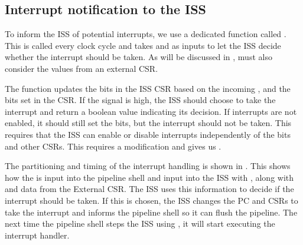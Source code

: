 \subsection{Interrupt notification to the ISS}

To inform the ISS of potential interrupts, we use a dedicated function called . This is called every clock cycle and takes  and  as inputs to let the ISS decide whether the interrupt should be taken. As will be discussed in ,  must also consider the values from an external CSR.

The  function updates the  bits in the ISS CSR based on the incoming , and the bits set in the  CSR. If the  signal is high, the ISS should choose to take the interrupt and return a boolean value indicating its decision. If interrupts are not enabled, it should still set the  bits, but the interrupt should not be taken. This requires that the ISS can enable or disable interrupts independently of the  bits and other CSRs. This requires a modification and gives us . 

The partitioning and timing of the interrupt handling is shown in . This shows how the  is input into the pipeline shell and input into the ISS with , along with  and data from the External CSR. The ISS uses this information to decide if the interrupt should be taken. If this is chosen, the ISS changes the PC and CSRs to take the interrupt and informs the pipeline shell so it can flush the pipeline. The next time the pipeline shell steps the ISS using , it will start executing the interrupt handler.

